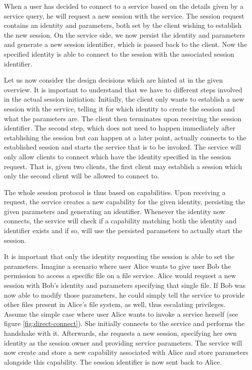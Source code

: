 When a user has decided to connect to a service based on the details given by a service query, he will request a new session with the service.
The session request contains an identity and parameters, both set by the client wishing to establish the new session.
On the service side, we now persist the identity and parameters and generate a new session identifier, which is passed back to the client.
Now the specified identity is able to connect to the session with the associated session identifier.

Let us now consider the design decisions which are hinted at in the given overview.
It is important to understand that we have to different steps involved in the actual session initiation:
Initially, the client only wants to establish a new session with the service, telling it for which identity to create the session and what the parameters are.
The client then terminates upon receiving the session identifier.
The second step, which does not need to happen immediately after establishing the session but can happen at a later point, actually connects to the established session and starts the service that is to be invoked.
The service will only allow clients to connect which have the identity specified in the session request.
That is, given two clients, the first client may establish a session which only the second client will be allowed to connect to.

The whole session protocol is thus based on capabilities.
Upon receiving a request, the service creates a new capability for the given identity, persisting the given parameters and generating an identifier.
Whenever the identity now connects, the service will check if a capability matching both the identity and identifier exists and if so, will use the persisted parameters to actually start the session.

It is important that only the identity requesting the session is able to set the parameters.
Imagine a scenario where user Alice wants to give user Bob the permission to access a specific file on a file service.
Alice would request a new session with Bob's identity and parameters specifying that single file.
If Bob was now able to modify those parameters, he could simply tell the service to provide other files present in Alice's file system, as well, thus escalating privileges.\\

Assume the simple case where user Alice wants to invoke a service herself (see figure \ref{fig:direct-connect}).
She initially connects to the service and performs the handshake with it.
Afterwards, she requests a new session, specifying her own identity as the session owner and providing service parameters.
The service will now create and store a new capability associated with Alice and store parameters alongside this capability.
The session identifier is now sent back to Alice.


